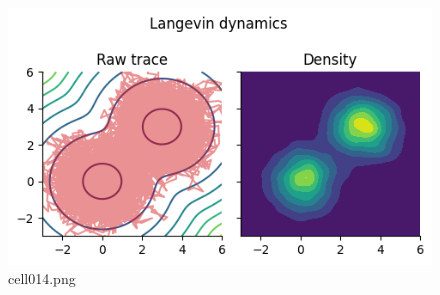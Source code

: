 \begin{figure}[ht]
	\centering
	\includegraphics[scale=0.8, max width=\linewidth]{./fig/bayesian-brain/mcmc/cell014.png}
	\caption{cell014.png}
	\label{cell014.png}
\end{figure}